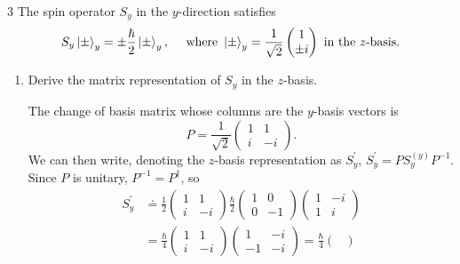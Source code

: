 \documentclass[11pt]{article}
\begin{document}
\begin{problem}{3}
  The spin operator \( S_y \) in the \( y \)-direction satisfies
  \begin{equation}
  \label{eq:3}
  S_y \ket{\pm}_{y} = \pm \frac{\hbar}{2} \ket{\pm}_y, \quad \text{ where } \ket{\pm}_y = \frac{1}{\sqrt{2}} \begin{pmatrix}
1 \\
\pm i
 \end{pmatrix} \text{ in the } z \text{-basis}.
  \end{equation}
  \begin{enumerate}[label=(\alph*)]
    \item Derive the matrix representation of \( S_y \) in the \( z \)-basis.
          \begin{answer}
            The change of basis matrix whose columns are the \( y \)-basis vectors is
            \begin{equation}
            \label{eq:15}
            P = \frac{1}{\sqrt{2}}\begin{pmatrix}
1  & 1 \\
i  & -i
 \end{pmatrix}.
            \end{equation}
            We can then write, denoting the \( z \)-basis representation as \( S_y^{\prime} \), \( S_y^{\prime} = P S_y^{(y)} P^{-1} \).
            Since \( P \) is unitary, \( P^{-1} = P^\dagger \), so
            \begin{equation}
              \begin{aligned}
            \label{eq:16}
            S_y^{\prime} &\doteq \frac{1}{2} \begin{pmatrix}
1  & 1 \\
i  & -i
 \end{pmatrix} \frac{\hbar}{2} \begin{pmatrix}
1  & 0 \\
0  & -1
 \end{pmatrix} \begin{pmatrix}
1  & -i \\
1  & i
 \end{pmatrix} \\
                &= \frac{\hbar}{4} \begin{pmatrix}
1  & 1 \\
i  & -i
 \end{pmatrix} \begin{pmatrix}
1  & -i \\
-1 & -i
 \end{pmatrix} = \frac{\hbar}{4} \begin{pmatrix}

\end{pmatrix}
\end{aligned}
\end{equation}
\end{answer}
\end{enumerate}
\end{problem}
\end{document}
